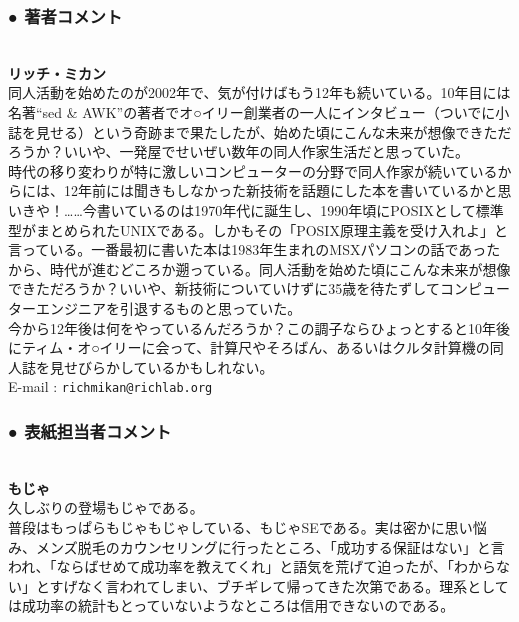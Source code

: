 \clearpage
\subsubsection*{● 著者コメント}
　\\
\noindent
\textbf{リッチ・ミカン} \\
\noindent
同人活動を始めたのが2002年で、気が付けばもう12年も続いている。10年目には名著``sed \& AWK''の著者でオ○イリー創業者の一人にインタビュー（ついでに小誌を見せる）という奇跡まで果たしたが、始めた頃にこんな未来が想像できただろうか？いいや、一発屋でせいぜい数年の同人作家生活だと思っていた。\\

\noindent
時代の移り変わりが特に激しいコンピューターの分野で同人作家が続いているからには、12年前には聞きもしなかった新技術を話題にした本を書いているかと思いきや！……今書いているのは1970年代に誕生し、1990年頃にPOSIXとして標準型がまとめられたUNIXである。しかもその「POSIX原理主義を受け入れよ」と言っている。一番最初に書いた本は1983年生まれのMSXパソコンの話であったから、時代が進むどころか遡っている。同人活動を始めた頃にこんな未来が想像できただろうか？いいや、新技術についていけずに35歳を待たずしてコンピューターエンジニアを引退するものと思っていた。\\

\noindent
今から12年後は何をやっているんだろうか？この調子ならひょっとすると10年後にティム・オ○イリーに会って、計算尺やそろばん、あるいはクルタ計算機の同人誌を見せびらかしているかもしれない。\\

\noindent
E-mail : \verb|richmikan@richlab.org| \\


\subsubsection*{● 表紙担当者コメント}
　\\
\noindent
\textbf{もじゃ} \\
\noindent
久しぶりの登場もじゃである。\\

\noindent
普段はもっぱらもじゃもじゃしている、もじゃSEである。実は密かに思い悩み、メンズ脱毛のカウンセリングに行ったところ、「成功する保証はない」と言われ、「ならばせめて成功率を教えてくれ」と語気を荒げて迫ったが、「わからない」とすげなく言われてしまい、ブチギレて帰ってきた次第である。理系としては成功率の統計もとっていないようなところは信用できないのである。\\

